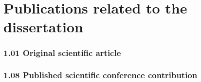

\chapter{Publications related to the dissertation}
\label{sec:publications}
\vspace{-.7cm}

\subsection*{1.01 Original scientific article}

\begin{bibunit}[mps4_5]
	\renewcommand{\bibname}{}
	\nocite{BiljanaIJDSST2012}
	\def\chapter#1{}
\end{bibunit}


\subsection*{1.08 Published scientific conference contribution}
\begin{bibunit}[mps4_5]
	\renewcommand{\bibname}{}
	\nocite{BiljanaIJDSST2012,BiljanaDSS2012,BiljanaOR2011}
	\def\chapter#1{}
\end{bibunit}
